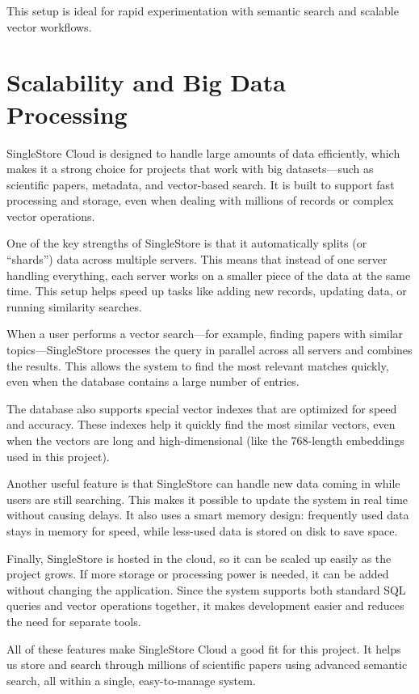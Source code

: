 \documentclass[11pt]{article}
\begin{document}
This setup is ideal for rapid experimentation with semantic search and scalable vector workflows.
\section*{Scalability and Big Data Processing}
\label{sec:orgd2765a6}

SingleStore Cloud is designed to handle large amounts of data efficiently, which makes it a strong choice for projects that work with big datasets—such as scientific papers, metadata, and vector-based search. It is built to support fast processing and storage, even when dealing with millions of records or complex vector operations.

One of the key strengths of SingleStore is that it automatically splits (or ``shards'') data across multiple servers. This means that instead of one server handling everything, each server works on a smaller piece of the data at the same time. This setup helps speed up tasks like adding new records, updating data, or running similarity searches.

When a user performs a vector search—for example, finding papers with similar topics—SingleStore processes the query in parallel across all servers and combines the results. This allows the system to find the most relevant matches quickly, even when the database contains a large number of entries.

The database also supports special vector indexes that are optimized for speed and accuracy. These indexes help it quickly find the most similar vectors, even when the vectors are long and high-dimensional (like the 768-length embeddings used in this project).

Another useful feature is that SingleStore can handle new data coming in while users are still searching. This makes it possible to update the system in real time without causing delays. It also uses a smart memory design: frequently used data stays in memory for speed, while less-used data is stored on disk to save space.

Finally, SingleStore is hosted in the cloud, so it can be scaled up easily as the project grows. If more storage or processing power is needed, it can be added without changing the application. Since the system supports both standard SQL queries and vector operations together, it makes development easier and reduces the need for separate tools.

All of these features make SingleStore Cloud a good fit for this project. It helps us store and search through millions of scientific papers using advanced semantic search, all within a single, easy-to-manage system.
\end{document}
